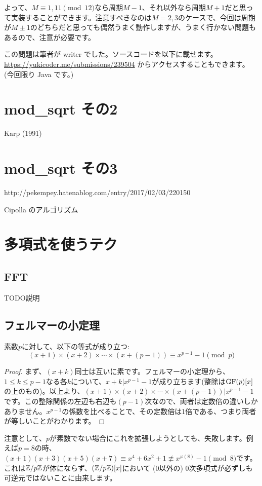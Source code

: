 \documentclass{jsarticle}
\begin{document}
  よって、$M \equiv 1, 11 \pmod{12}$なら周期$M-1$、それ以外なら周期$M + 1$だと思って実装することができます。注意すべきなのは$M = 2,3$のケースで、今回は周期が$M \pm 1$のどちらだと思っても偶然うまく動作しますが、うまく行かない問題もあるので、注意が必要です。

  この問題は筆者が writer でした。ソースコードを以下に載せます。\url{https://yukicoder.me/submissions/239504} からアクセスすることもできます。 (今回限り Java です。)
  
 \section{mod\_sqrt その2}
 Karp (1991)~\cite{Karp1991}
 \section{mod\_sqrt その3}
 http://pekempey.hatenablog.com/entry/2017/02/03/220150

 Cipolla のアルゴリズム
 \section{多項式を使うテク}
 \label{sec:technique-using-polynomials}
  \subsection{FFT}
  TODO説明
  \subsection{フェルマーの小定理}
  \begin{theorem}
   \label{thm:polynomial-fermat}
   素数$p$に対して、以下の等式が成り立つ:
   \begin{displaymath}
    (x+1) \times (x+2) \times \cdots \times (x + (p - 1)) \equiv x^{p-1} - 1 \pmod p
   \end{displaymath}
  \end{theorem}
  \begin{proof}
  まず、$(x+k)$同士は互いに素です。フェルマーの小定理から、$1 \le k \le p - 1$なる各$k$について、$x + k | x^{p-1} - 1$が成り立ちます(整除は$\mathrm{GF}(p)[x]$の上のもの)。以上より、$(x+1) \times (x+2) \times \cdots \times (x + (p - 1)) | x^{p-1}-1$です。この整除関係の左辺も右辺も$(p-1)$次なので、両者は定数倍の違いしかありません。$x^{p-1}$の係数を比べることで、その定数倍は1倍である、つまり両者が等しいことがわかります。
  \end{proof}
  注意として、$p$が素数でない場合にこれを拡張しようとしても、失敗します。例えば$p=8$の時、$(x+1)(x+3)(x+5)(x+7) \equiv x^4 + 6x^2 + 1 \not \equiv x^{\varphi(8)}-1 \pmod 8$です。これは$\mathbb{Z}/p\mathbb{Z}$が体にならず、$(\mathbb{Z}/p\mathbb{Z})[x]$において (0以外の) 0次多項式が必ずしも可逆元ではないことに由来します。
\end{document}
